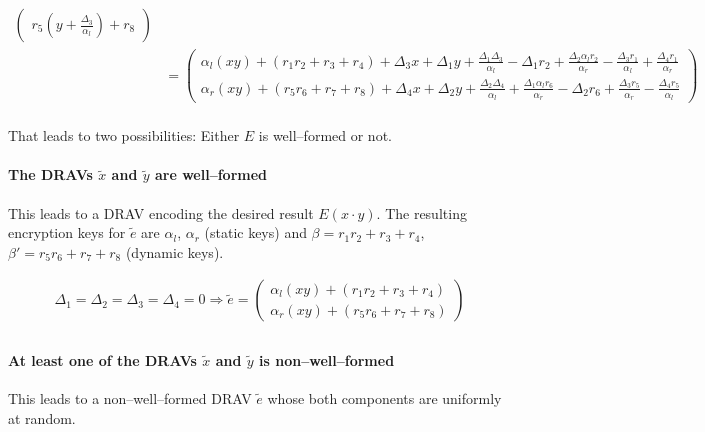 \begin{align*}
\begin{pmatrix}
    r_5          \left(y + \frac{\Delta_3}{\alpha_l}\right) + r_8
  \end{pmatrix} \\
%
  & =
  \begin{pmatrix}
    \alpha_l(xy) + (r_1r_2 + r_3 + r_4)
    + \Delta_3x + \Delta_1y
    + \frac{\Delta_1\Delta_3}{\alpha_l}
    - \Delta_1r_2
    + \frac{\Delta_2\alpha_lr_2}{\alpha_r}
    - \frac{\Delta_3r_1}{\alpha_l}
    + \frac{\Delta_4r_1}{\alpha_r}
    \\
    \alpha_r(xy) + (r_5r_6 + r_7 + r_8)
    + \Delta_4x + \Delta_2y
    + \frac{\Delta_2\Delta_4}{\alpha_l}
    + \frac{\Delta_1\alpha_lr_6}{\alpha_r}
    - \Delta_2r_6
    + \frac{\Delta_3r_5}{\alpha_r}
    - \frac{\Delta_4r_5}{\alpha_l}
  \end{pmatrix} \\
%
\end{align*}

\noindent{}That leads to two possibilities: Either $E$ is well--formed or not.

\paragraph{The DRAVs $\widetilde{x}$ and $\widetilde{y}$ are well--formed}

This leads to a DRAV encoding the desired result $E(x \cdot y)$. The resulting
encryption keys for $\widetilde{e}$ are $\alpha_l$, $\alpha_r$ (static keys) and
$\beta = r_1r_2 + r_3 + r_4$, $\beta' = r_5r_6 + r_7 + r_8$ (dynamic keys).

\begin{align*}
  \Delta_1=\Delta_2=\Delta_3=\Delta_4=0 \Rightarrow
  \widetilde{e} =
  \begin{pmatrix}
    \alpha_l(xy) + (r_1r_2 + r_3 + r_4) \\
    \alpha_r(xy) + (r_5r_6 + r_7 + r_8)
  \end{pmatrix} \\
\end{align*}

\paragraph{At least one of the DRAVs $\widetilde{x}$ and $\widetilde{y}$ is
non--well--formed} This leads to a non--well--formed DRAV $\widetilde{e}$ whose
both components are uniformly at random.

